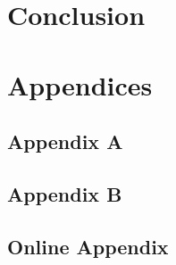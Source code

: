 \documentclass[12pt]{article}
\begin{document}
\section{Conclusion} \label{sec:conclusion}


% 

\clearpage
\onehalfspacing %

%
\printbibliography


\clearpage
\appendix
\section*{Appendices}
\renewcommand{\thesubsection}{\Alph{subsection}}
\renewcommand\thefigure{\thesubsection.\arabic{figure}}
\renewcommand{\thetable}{\thesubsection.\arabic{table}}

\subsection{Appendix A}\label{app-A}

\clearpage
\subsection{Appendix B}\label{app-B}



\newcommand*{\nolink}[1]{%
  {\protect\NoHyper#1\protect\endNoHyper}%
}

\clearpage
\begin{center}
    \section*{Online Appendix}
    \textbf{\Large \thetitle}\\
    \vspace{1em}
    \theauthor
\end{center}
\vspace{1em}
\end{document}
